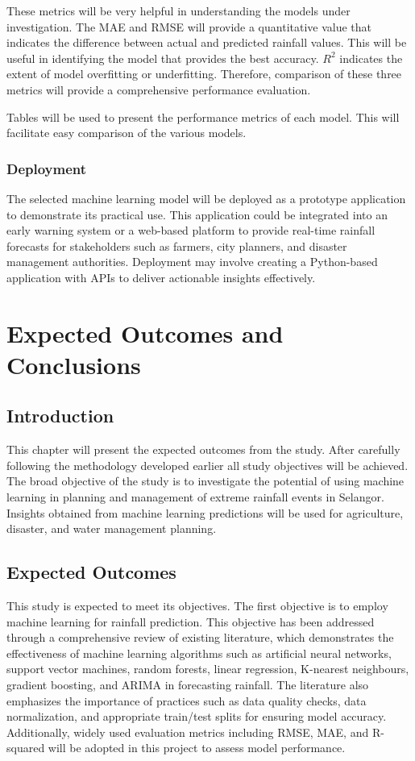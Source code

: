 \documentclass{article}
\begin{document}
These metrics will be very helpful in understanding the models under investigation. The MAE
and RMSE will provide a quantitative value that indicates the difference between actual and
predicted rainfall values. This will be useful in identifying the model that provides the best
accuracy. $R^2$ indicates the extent of model overfitting or underfitting. Therefore, comparison of
these three metrics will provide a comprehensive performance evaluation.

Tables will be used to present the performance metrics of each model. This will facilitate easy
comparison of the various models.

\subsubsection{Deployment}

The selected machine learning model will be deployed as a prototype application to
demonstrate its practical use. This application could be integrated into an early warning system
or a web-based platform to provide real-time rainfall forecasts for stakeholders such as farmers,
city planners, and disaster management authorities. Deployment may involve creating a
Python-based application with APIs to deliver actionable insights effectively.

\section{Expected Outcomes and Conclusions}

\subsection{Introduction}

This chapter will present the expected outcomes from the study. After carefully following
the methodology developed earlier all study objectives will be achieved. The broad objective
of the study is to investigate the potential of using machine learning in planning and
management of extreme rainfall events in Selangor. Insights obtained from machine learning
predictions will be used for agriculture, disaster, and water management planning.

\subsection{Expected Outcomes}

This study is expected to meet its objectives. The first objective is to employ machine
learning for rainfall prediction. This objective has been addressed through a comprehensive
review of existing literature, which demonstrates the effectiveness of machine learning
algorithms such as artificial neural networks, support vector machines, random forests, linear
regression, K-nearest neighbours, gradient boosting, and ARIMA in forecasting rainfall. The
literature also emphasizes the importance of practices such as data quality checks, data
normalization, and appropriate train/test splits for ensuring model accuracy. Additionally,
widely used evaluation metrics including RMSE, MAE, and R-squared will be adopted in this
project to assess model performance.
\end{document}

